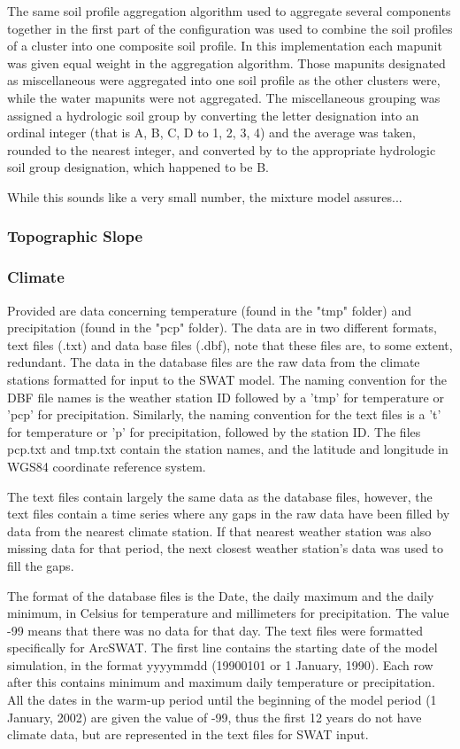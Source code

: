 \documentclass[10pt,letterpaper]{article}%
\begin{document}
		The same soil profile aggregation algorithm \citep{beaudette_aqp_2013} used to aggregate several components together in the first part of the configuration was used to combine the soil profiles of a cluster into one composite soil profile. In this implementation each mapunit was given equal weight in the aggregation algorithm. Those mapunits designated as miscellaneous were aggregated into one soil profile as the other clusters were, while the water mapunits were not aggregated. The miscellaneous  grouping was assigned a hydrologic soil group by converting the letter designation into an ordinal integer (that is A, B, C, D to 1, 2, 3, 4) and the average was taken, rounded to the nearest integer, and converted by to the appropriate hydrologic soil group designation, which happened to be B. 
		
		While this sounds like a very small number, the mixture model assures... 
		
		\subsubsection{Topographic Slope}
		\subsubsection{Climate}	
	
		Provided are data concerning temperature (found in the "tmp" folder) and precipitation	(found in the "pcp" folder). The data are in two different formats, text files (.txt) and data base files (.dbf),	note that these files are, to some extent, redundant. The data in the database files are the raw data from the climate stations formatted for input to the SWAT model. The naming convention for the DBF file names is the weather station ID followed by a 'tmp' for temperature or 'pcp' for precipitation.	Similarly, the naming convention for the text files is a 't' for temperature or 'p' for precipitation, followed by the station ID. The files pcp.txt and tmp.txt contain the station names, and the latitude and longitude in WGS84 coordinate reference system.
	
		The text files contain largely the same data as the database files, however, the text files contain a time series where any gaps in the raw data have been filled by data from the nearest climate station. If that nearest weather station was also missing data for that period, the next closest weather station's data was used to fill the gaps. 
	
		The format of the database files is the Date, the daily maximum and the daily minimum, in Celsius for temperature and millimeters for precipitation. The value -99 means that there was no data for that day. The text files were formatted specifically for ArcSWAT. The first line contains the starting date of the model simulation, in the format yyyymmdd (19900101 or 1 January, 1990). Each row after this contains minimum and maximum daily temperature or precipitation. All the dates in the warm-up period until the beginning of the model period (1 January, 2002) are given the value of -99, thus the first 12 years do not have climate data, but are represented in the text files for SWAT input. 
		
\end{document}
